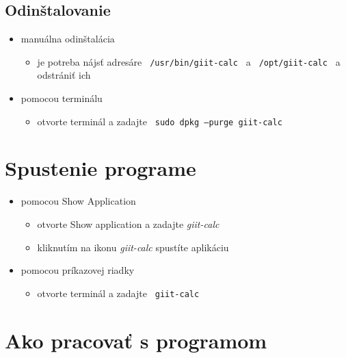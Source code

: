 \documentclass[a4paper, 11pt]{article}
\begin{document}
    \subsection{Odinštalovanie}
    \begin{itemize}
        \item manuálna odinštalácia
        \begin{itemize}
            \item je potreba nájsť adresáre \texttt{ /usr/bin/giit-calc } a \texttt{ /opt/giit-calc } a odstrániť ich
        \end{itemize}
        \item pomocou terminálu
        \begin{itemize}
            \item otvorte terminál a zadajte \texttt{ sudo dpkg --purge giit-calc }
        \end{itemize}
    \end{itemize}
    \section{Spustenie programe}
    \begin{itemize}
        \item pomocou Show Application
        \begin{itemize}
            \item otvorte Show application a zadajte \emph{giit-calc}
            \item kliknutím na ikonu \emph{giit-calc} spustíte aplikáciu
        \end{itemize}
    \end{itemize}
    \begin{itemize}
        \item pomocou príkazovej riadky
        \begin{itemize}
            \item otvorte terminál a zadajte \texttt{ giit-calc }
        \end{itemize}
    \end{itemize}
    \newpage
    \section{Ako pracovať s programom}
\end{document}

